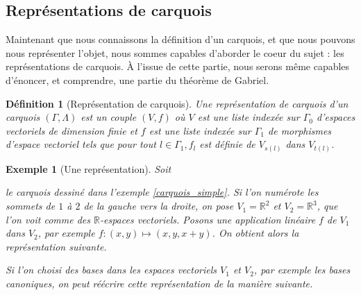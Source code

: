 \documentclass[a4paper,11pt]{article}
\newtheorem{defi}[thm]{Définition}%
\newtheorem{ex}[thm]{Exemple}%
\begin{document}
\subsection{Représentations de carquois}
Maintenant que nous connaissons la définition d'un carquois, et que nous pouvons nous représenter l'objet, nous sommes capables d'aborder le coeur du sujet : les représentations de carquois. À l'issue de cette partie, nous serons même capables d'énoncer, et comprendre, une partie du théorème de Gabriel.
\begin{defi}[Représentation de carquois]
	Une \emph{représentation de carquois} d'un carquois $(\Gamma,\Lambda)$ est un couple $(V,f)$ où $V$ est une liste indexée sur $\Gamma_0$ d'espaces vectoriels de dimension finie et $f$ est une liste indexée sur $\Gamma_1$ de morphismes d'espace vectoriel tels que pour tout $l \in \Gamma_1, f_l$ est définie de $V_{s(l)}$ dans $V_{t(l)}$.
\end{defi}
\begin{ex}[Une représentation]
	Soit 
	le carquois dessiné dans l'exemple \ref{carquois_simple}. Si l'on numérote les sommets de $1$ à $2$ de la gauche vers la droite, on pose $V_1=\mathbb R^2$ et $V_2=\mathbb R^3$, que l'on voit comme des $\mathbb R$-espaces vectoriels. Posons une application linéaire $f$ de $V_1$ dans $V_2$, par exemple $f:(x,y)\mapsto(x,y,x+y)$. On obtient alors la représentation suivante.
	\begin{center}
	\end{center}
	Si l'on choisi des bases dans les espaces vectoriels $V_1$ et $V_2$, par exemple les bases canoniques, on peut réécrire cette représentation de la manière suivante.
	\begin{center}
	\end{center}

\end{ex}
\end{document}
